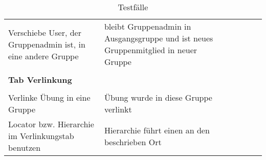 \begin{table}[]
	\centering
	\caption{Testfälle}
	\label{table3}
	\begin{tabular}{p{6cm}p{7cm}p{3cm}llll}Verschiebe User, der Gruppenadmin ist, in eine andere Gruppe                                                                           & bleibt Gruppenadmin in Ausgangsgruppe und ist neues Gruppenmitglied in neuer Gruppe                                                                              & \checkmark          &  &  &  \\
		&                                                                                                                                                                  &             &  &  &  \\
		\textbf{	Tab Verlinkung  }                                                                                                                     &                                                                                                                                                                  &             &  &  &  \\
			&                                                                                                                                                                  &             &  &  &  \\
		Verlinke Übung in eine Gruppe                                                                                                        & Übung wurde in diese Gruppe verlinkt                                                                                                                             & \checkmark           &  &  &  \\
		Locator bzw. Hierarchie im Verlinkungstab benutzen                                                                                    & Hierarchie führt einen an den beschrieben Ort                                                                                                                    & \checkmark           &  &  &  \\
		

\end{tabular}
\end{table}

